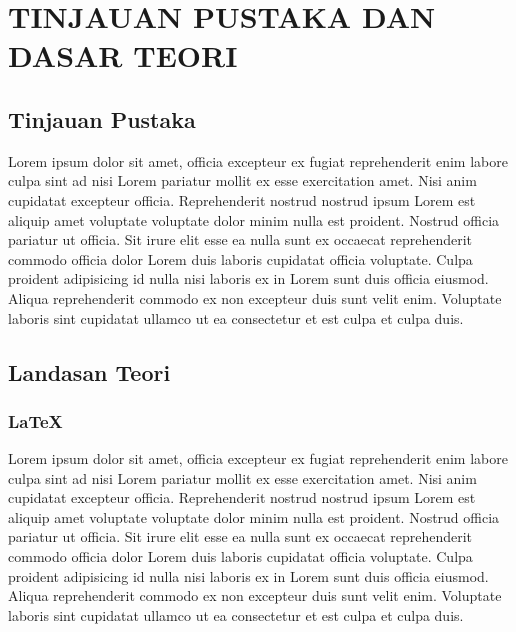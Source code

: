 \chapter{TINJAUAN PUSTAKA DAN DASAR TEORI}

\section{Tinjauan Pustaka}
Lorem ipsum dolor sit amet, officia excepteur ex fugiat reprehenderit enim labore culpa sint ad nisi Lorem pariatur mollit ex esse exercitation amet. Nisi anim cupidatat excepteur officia. Reprehenderit nostrud nostrud ipsum Lorem est aliquip amet voluptate voluptate dolor minim nulla est proident. Nostrud officia pariatur ut officia. Sit irure elit esse ea nulla sunt ex occaecat reprehenderit commodo officia dolor Lorem duis laboris cupidatat officia voluptate. Culpa proident adipisicing id nulla nisi laboris ex in Lorem sunt duis officia eiusmod. Aliqua reprehenderit commodo ex non excepteur duis sunt velit enim. Voluptate laboris sint cupidatat ullamco ut ea consectetur et est culpa et culpa duis.

\section{Landasan Teori}

\subsection{\LaTeX}
Lorem ipsum dolor sit amet, officia excepteur ex fugiat \cite{lee2000latex} reprehenderit enim labore culpa sint ad nisi Lorem pariatur mollit ex esse exercitation amet. Nisi anim cupidatat excepteur officia. Reprehenderit nostrud nostrud ipsum Lorem est aliquip amet voluptate voluptate dolor minim nulla est proident. Nostrud officia pariatur ut officia. Sit irure elit esse ea nulla sunt ex occaecat reprehenderit commodo officia dolor Lorem duis laboris cupidatat officia voluptate. Culpa proident adipisicing id nulla nisi laboris ex in Lorem sunt duis officia eiusmod. Aliqua reprehenderit commodo ex non excepteur duis sunt velit enim. Voluptate laboris sint cupidatat ullamco ut ea consectetur et est culpa et culpa duis.


